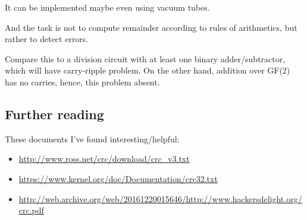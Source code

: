 It can be implemented maybe even using vacuum tubes.

And the task is not to compute remainder according to rules of arithmetics, but rather to detect errors.

Compare this to a division circuit with at least one binary adder/subtractor, which will have carry-ripple problem.
On the other hand, addition over GF(2) has no carries, hence, this problem absent.

\subsection{Further reading}

These documents I've found interesting/helpful:

\begin{itemize}

\item \url{http://www.ross.net/crc/download/crc_v3.txt}
\item \url{https://www.kernel.org/doc/Documentation/crc32.txt}
\item \url{http://web.archive.org/web/20161220015646/http://www.hackersdelight.org/crc.pdf}

\end{itemize}

